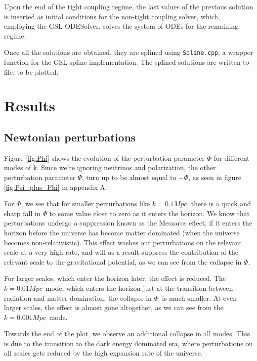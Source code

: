 \documentclass[10pt, a4paper]{article}
\begin{document}
Upon the end of the tight coupling regime, the last values of the previous solution is inserted as initial conditions for the non-tight coupling solver, which, employing the GSL ODESolver, solves the system of ODEs for the remaining regime.

Once all the solutions are obtained, they are splined using \texttt{Spline.cpp}, a wrapper function for the GSL spline implementation. The splined solutions are written to file, to be plotted.



\section{Results}
\subsection{Newtonian perturbations}
Figure \ref{fig:Phi} shows the evolution of the perturbation parameter $\Phi$ for different modes of k. Since we're ignoring neutrinos and polarization, the other perturbation parameter $\Psi$, turn up to be almost equal to $-\Phi$, as seen in figure \ref{fig:Psi_plus_Phi} in appendix A.

For $\Phi$, we see that for smaller perturbations like $k=0.1Mpc$, there is a quick and sharp fall in $\Phi$ to some value close to zero as it enters the horizon. We know that perturbations undergo a suppression known as the Meszaros effect, if it enters the horizon before the universe has become matter dominated (when the universe becomes non-relativistic). This effect washes out perturbations on the relevant scale at a very high rate, and will as a result suppress the contribution of the relevant scale to the gravitational potential, as we can see from the collapse in $\Phi$.

For larger scales, which enter the horizon later, the effect is reduced. The $k=0.01Mpc$ mode, which enters the horizon just at the transition between radiation and matter domination, the collapse in $\Phi$ is much smaller. At even larger scales, the effect is almost gone altogether, as we can see from the $k=0.001Mpc$ mode.

Towards the end of the plot, we observe an additional collapse in all modes. This is due to the transition to the dark energy dominated era, where perturbations on all scales gets reduced by the high expansion rate of the universe.
\end{document}
